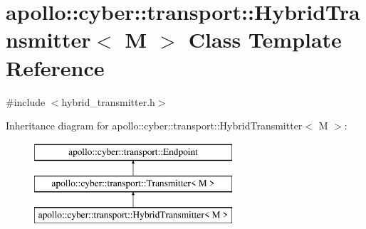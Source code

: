 \hypertarget{classapollo_1_1cyber_1_1transport_1_1HybridTransmitter}{\section{apollo\-:\-:cyber\-:\-:transport\-:\-:Hybrid\-Transmitter$<$ M $>$ Class Template Reference}
\label{classapollo_1_1cyber_1_1transport_1_1HybridTransmitter}
}


{\ttfamily \#include $<$hybrid\-\_\-transmitter.\-h$>$}

Inheritance diagram for apollo\-:\-:cyber\-:\-:transport\-:\-:Hybrid\-Transmitter$<$ M $>$\-:\begin{figure}[H]
\begin{center}
\leavevmode
\includegraphics[height=3.000000cm]{classapollo_1_1cyber_1_1transport_1_1HybridTransmitter}
\end{center}
\end{figure}

